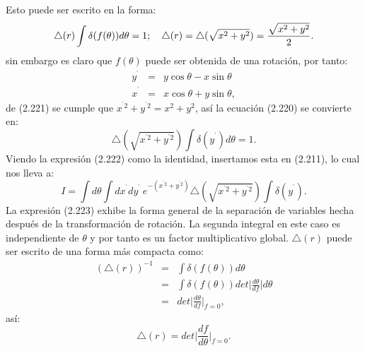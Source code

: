 Esto puede ser escrito en la forma:
\begin{equation}
\triangle(r)\int\delta(f(\theta))d\theta=1;\ \ \ \triangle(r)=\text{\ensuremath{\triangle}}(\sqrt{x^{2}+y^{2}})=\frac{\sqrt{x^{2}+y^{2}}}{2}.
\end{equation}
sin embargo es claro que $f(\theta)$ puede ser obtenida de una rotación, por tanto:
\begin{eqnarray}
\nonumber y^{^{\prime}}&=&y\cos \theta -x\sin \theta\\
x^{^{\prime}}&=&x\cos \theta +y\sin \theta ,
\end{eqnarray}
de (2.221) se cumple que $x^{^{\prime} 2}+y^{^{\prime} 2}=x^2+y^2$, así la ecuación (2.220) se convierte en:
\begin{equation}
\triangle(\sqrt{x^{^{\prime}2}+y^{^{\prime}2}})\int\delta(y^{^{\prime}})d\theta=1.
\end{equation}
Viendo la expresión (2.222) como la identidad, insertamos esta en (2.211), lo cual nos lleva a:
\begin{equation}
I=\int d\theta \int dx^{^{\prime}}dy^{^{\prime}}\ e^{-(x^{^{\prime} 2}+y^{^{\prime} 2})}\triangle(\sqrt{x^{^{\prime}2}+y^{^{\prime}2}})\int\delta(y^{^{\prime}}).
\end{equation}
La expresión (2.223) exhibe la forma general de la separación de variables hecha después de la transformación de rotación. La segunda integral en este caso es independiente de $\theta$ y por tanto es un factor multiplicativo global. $\triangle (r)$ puede ser escrito de una forma más compacta como:
\begin{eqnarray}
\nonumber (\triangle (r))^{-1}&=&\int \delta(f(\theta))d\theta \\
\nonumber &=& \int \delta(f(\theta))det\bigg|\frac{d\theta}{df}\bigg| d\theta\\
&=&det\bigg|\frac{d\theta}{df}\bigg|_{f=0},
\end{eqnarray}
así:
\begin{equation}
\triangle (r)=det\bigg|\frac{df}{d\theta}\bigg|_{f=0}.
\end{equation}
